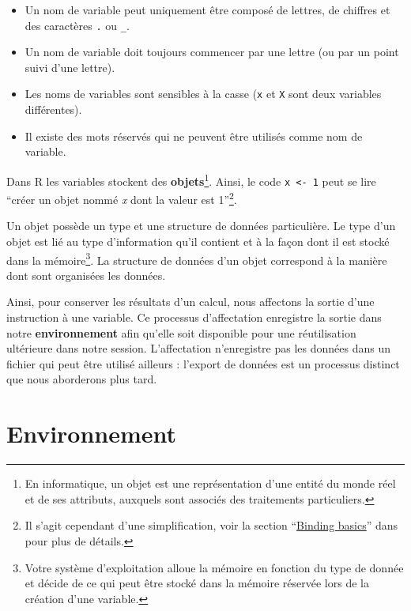 \documentclass[
  french,
]{scrbook}
\providecommand{\tightlist}{%
  \setlength{\itemsep}{0pt}\setlength{\parskip}{0pt}}
\begin{document}
\begin{tcolorbox}[fonttitle=\sffamily\bfseries\large,title=Important,colframe=darkgreen]

\begin{itemize}
\tightlist
\item
  Un nom de variable peut uniquement être composé de lettres, de chiffres et des caractères \texttt{.} ou \texttt{\_}.
\item
  Un nom de variable doit toujours commencer par une lettre (ou par un point suivi d'une lettre).
\item
  Les noms de variables sont sensibles à la casse (\texttt{x} et \texttt{X} sont deux variables différentes).
\item
  Il existe des mots réservés qui ne peuvent être utilisés comme nom de variable.
\end{itemize}

\end{tcolorbox}

Dans R les variables stockent des \textbf{objets}\footnote{En informatique, un objet est une représentation d'une entité du monde réel et de ses attributs, auxquels sont associés des traitements particuliers.}. Ainsi, le code \texttt{x\ \textless{}-\ 1} peut se lire ``créer un objet nommé \emph{x} dont la valeur est 1''\footnote{Il s'agit cependant d'une simplification, voir la section ``\href{https://adv-r.hadley.nz/names-values.html\#binding-basics}{Binding basics}'' dans \textcite{wickham2019} pour plus de détails.}.

Un objet possède un type et une structure de données particulière. Le type d'un objet est lié au type d'information qu'il contient et à la façon dont il est stocké dans la mémoire\footnote{Votre système d'exploitation alloue la mémoire en fonction du type de donnée et décide de ce qui peut être stocké dans la mémoire réservée lors de la création d'une variable.}. La structure de données d'un objet correspond à la manière dont sont organisées les données.

Ainsi, pour conserver les résultats d'un calcul, nous affectons la sortie d'une instruction à une variable. Ce processus d'affectation enregistre la sortie dans notre \textbf{environnement} afin qu'elle soit disponible pour une réutilisation ultérieure dans notre session. L'affectation n'enregistre pas les données dans un fichier qui peut être utilisé ailleurs : l'export de données est un processus distinct que nous aborderons plus tard.

\hypertarget{environnement}{%
\section{Environnement}\label{environnement}}
\end{document}
